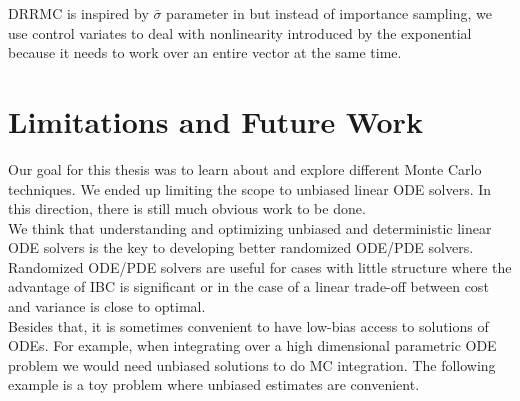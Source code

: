 \documentclass[a4paper,12pt]{article}
\begin{document}
\begin{example}[DRRMC]
\end{example}

\begin{related}[DRRMC]
    DRRMC is inspired by  $\bar{\sigma}$ parameter in \cite{sawhney_grid-free_2022} but
    instead of importance sampling, we use control variates to deal with
    nonlinearity introduced by the exponential because it needs to work over
    an entire vector at the same time.
\end{related}

\section{Limitations and Future Work}

Our goal for this thesis was to learn about and explore different Monte Carlo techniques.
We ended up limiting the scope to unbiased linear ODE solvers. In this direction,
there is still much obvious work to be done. \\

We think that understanding and optimizing unbiased and deterministic linear ODE solvers
is the key to developing better randomized ODE/PDE solvers.
Randomized ODE/PDE solvers are useful for cases with little structure
where the advantage of IBC is significant or in the case of a linear trade-off
between cost and variance is close to optimal. \\


Besides that, it is sometimes convenient to have low-bias access to solutions of
ODEs. For example, when integrating over a high dimensional parametric ODE problem
we would need unbiased solutions to do MC integration. The following example is
a toy problem where unbiased estimates are convenient.
\end{document}

